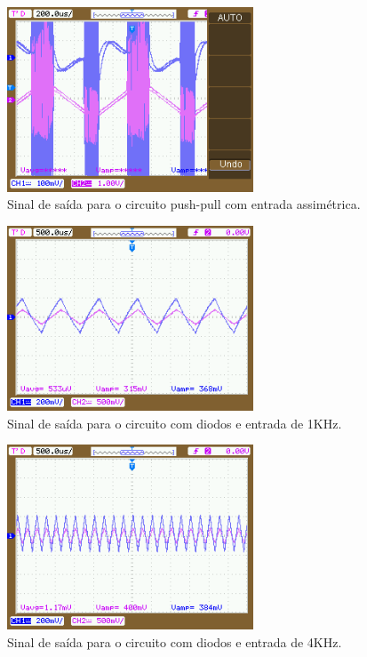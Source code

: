     \begin{figure}[h!]
        \centering
        \includegraphics[height=5.5cm]{imgSource/oscilloscope/NewFile7.png}
        \caption{Sinal de saída para o circuito push-pull com entrada assimétrica.}
        \label{fig:newFile7}
    \end{figure}
    
    \begin{figure}[h!]
        \centering
        \includegraphics[height=5.5cm]{imgSource/oscilloscope/NewFile8.png}
        \caption{Sinal de saída para o circuito com diodos e entrada de 1KHz.}
        \label{fig:newFile8}
    \end{figure}
    
    \begin{figure}[h!]
        \centering
        \includegraphics[height=5.5cm]{imgSource/oscilloscope/NewFile9.png}
        \caption{Sinal de saída para o circuito com diodos e entrada de 4KHz.}
        \label{fig:newFile9}
    \end{figure}
    
